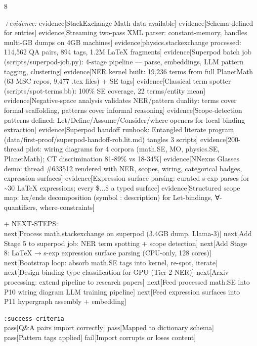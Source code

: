 \documentclass[landscape]{article}
\newcommand{\flexitag}[1]{\textcolor[gray]{0.35}{\textit{#1}}}
\newenvironment{devmapactive}{%
  \def\FrameCommand{\colorbox{devmapactivebg}}%
  \setlength{\fboxsep}{2pt}%
  \MakeFramed{\advance\hsize-\width \FrameRestore}%
}{\endMakeFramed}
\begin{document}
\begin{paracol}{8}
\begin{devmapactive}
  \flexitag{+evidence:} evidence[StackExchange Math data available] evidence[Schema defined for entries] evidence[Streaming two-pass XML parser: constant-memory, handles multi-GB dumps on 4GB machines] evidence[physics.stackexchange processed: 114,562 QA pairs, 894 tags, 1.2M LaTeX fragments] evidence[Superpod batch job (scripts/superpod-job.py): 4-stage pipeline — parse, embeddings, LLM pattern tagging, clustering] evidence[NER kernel built: 19,236 terms from full PlanetMath (63 MSC repos, 9,477 .tex files) + SE tags] evidence[Classical term spotter (scripts/spot-terms.bb): 100\% SE coverage, 22 terms/entity mean] evidence[Negative-space analysis validates NER/pattern duality: terms cover formal scaffolding, patterns cover informal reasoning] evidence[Scope-detection patterns defined: Let/Define/Assume/Consider/where openers for local binding extraction] evidence[Superpod handoff runbook: Entangled literate program (data/first-proof/superpod-handoff-rob.lit.md) tangles 3 scripts] evidence[200-thread pilot: wiring diagrams for 4 corpora (math.SE, MO, physics.SE, PlanetMath); CT discrimination 81-89\% vs 18-34\%] evidence[NNexus Glasses demo: thread \#633512 rendered with NER, scopes, wiring, categorical badges, expression surfaces] evidence[Expression surface parsing: curated s-exp parses for \textasciitilde{}30 LaTeX expressions; every \$...\$ a typed surface] evidence[Structured scope map: hx/ends decomposition (symbol : description) for Let-bindings, ∀-quantifiers, where-constraints]\\
\par
  + NEXT-STEPS:\\
    next[Process math.stackexchange on superpod (3.4GB dump, Llama-3)] next[Add Stage 5 to superpod job: NER term spotting + scope detection] next[Add Stage 8: LaTeX → s-exp expression surface parsing (CPU-only, 128 cores)] next[Bootstrap loop: absorb math.SE tags into kernel, re-spot, iterate] next[Design binding type classification for GPU (Tier 2 NER)] next[Arxiv processing: extend pipeline to research papers] next[Feed processed math.SE into P10 wiring diagram LLM training pipeline] next[Feed expression surfaces into P11 hypergraph assembly + embedding]\\
\par
  \texttt{:\allowbreak{}success-\allowbreak{}criteria}\\
    pass[Q\&A pairs import correctly] pass[Mapped to dictionary schema] pass[Pattern tags applied] fail[Import corrupts or loses content]\\
\par

\end{devmapactive}
\end{paracol}
\end{document}
